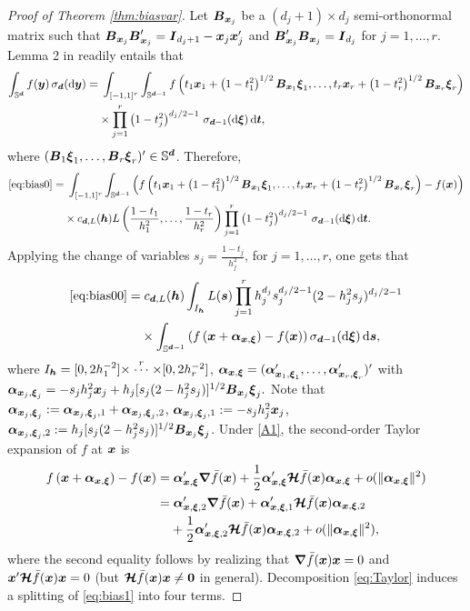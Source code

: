 \documentclass[oneside,11pt]{article}
\begin{document}
\begin{proof}[Proof of Theorem \ref{thm:biasvar}]
Let $\bB_{\bx_j}$ be a $(d_j+1)\times d_j$ semi-orthonormal matrix such that $\bB_{\bx_j}\bB_{\bx_j}'=\bI_{d_j+1}-\bx_j\bx_j'$ and $\bB_{\bx_j}'\bB_{\bx_j}=\bI_{d_j}$ for $j=1,\ldots,r$. Lemma 2 in \cite{Garcia-Portugues2013b} readily entails that
\begin{align*}
    \int_{\Sr}f(\by)\,\sigmar(\rd\by)=&\;\int_{[-1,1]^r}\int_{\mathbb{S}^{\bd-1}} f\lrp{t_1 \bx_1+\left(1-t_1^2\right)^{1/2} \bB_{\bx_1} \bxi_1,\ldots,t_r \bx_r+\left(1-t_r^2\right)^{1/2} \bB_{\bx_r} \bxi_r}\\
    &\times \prod_{j=1}^r \left(1-t_j^2\right)^{d_j/2-1}\,\sigmarm(\rd\bxi)\,\rd \bt,
\end{align*}
where $(\bB_1\bxi_1,\ldots,\bB_r\bxi_r)'\in\Sr$. Therefore,
\begin{align}
	\eqref{eq:bias0}=&\;\int_{[-1,1]^r}\int_{\mathbb{S}^{\bd-1}}\left(f\lrp{t_1 \bx_1+\left(1-t_1^2\right)^{1/2} \bB_{\bx_1} \bxi_1,\ldots,t_r \bx_r+\left(1-t_r^2\right)^{1/2} \bB_{\bx_r} \bxi_r}-f(\bx)\right)\nonumber\\
	&\times c_{\bd,L}(\bh)L\lrp{\frac{1-t_1}{h_1^2},\ldots, \frac{1-t_r}{h_r^2}}  \prod_{j=1}^r \left(1-t_j^2\right)^{d_j/2-1}\,\sigmarm(\rd\bxi)\,\rd \bt.\label{eq:bias00}
\end{align}
Applying the change of variables $s_j=\frac{1-t_j}{h_j^2}$, for $j=1,\ldots,r$, one gets that
\begin{align}
    \eqref{eq:bias00}=&\; c_{\bd,L}(\bh)\int_{I_\bh} L(\bs)\prod_{j=1}^r h_j^{d_j}s_j^{d_j/2-1} (2-h_j^2s_j)^{d_j/2-1}\nonumber\\
    & \times \int_{\mathbb{S}^{\bd-1}}\left(f\left(\bx+\ba_{\bx,\bxi}\right)-f(\bx)\right)\sigmarm(\rd\bxi)\,\rd \bs,\label{eq:bias1}
\end{align}
where $I_\bh=[0,2h^{-2}_1]\times\stackrel{r}{\cdots}\times[0,2h^{-2}_r]$, $\ba_{\bx,\bxi}=(\ba_{\bx_1,\bxi_1}',\ldots,\ba_{\bx_r,\bxi_r}')'$ with
$
\ba_{\bx_j,\bxi_j}=-s_jh_j^2\bx_j+h_j[s_j(2-h_j^2s_j)]^{1/2}\bB_{\bx_j}\bxi_j.
$
Note that  $\ba_{\bx_j,\bxi_j}\defin \ba_{\bx_j,\bxi_j,1}+\ba_{\bx_j,\bxi_j,2}$, $\ba_{\bx_j,\bxi_j,1}\defin -s_jh_j^2\bx_j$, $\ba_{\bx_j,\bxi_j,2}\defin h_j[s_j(2-h_j^2s_j)]^{1/2}\bB_{\bx_j}\bxi_j$. Under \ref{A1}, the second-order Taylor expansion of $f$ at $\bx$ is
\begin{align}
    f\left(\bx+\ba_{\bx,\bxi}\right)-f(\bx)=&\;\ba'_{\bx,\bxi}\bnabla \bar{f}(\bx)+\frac{1}{2}\ba'_{\bx,\bxi}\bHcal \bar{f}(\bx)\ba_{\bx,\bxi}+o(\|\ba_{\bx,\bxi}\|^2)\nonumber\\
    =&\;\ba'_{\bx,\bxi,2}\bnabla \bar{f}(\bx)+\ba'_{\bx,\bxi,1}\bHcal \bar{f}(\bx)\ba_{\bx,\bxi,2}\nonumber\\
    &+\frac{1}{2}\ba'_{\bx,\bxi,2}\bHcal \bar{f}(\bx)\ba_{\bx,\bxi,2}+o(\|\ba_{\bx,\bxi}\|^2),\label{eq:Taylor}
\end{align}
where the second equality follows by realizing that $\bnabla \bar{f}(\bx) \bx=0$ and $\bx'\bHcal \bar{f}(\bx) \bx=0$ (but $\bHcal \bar{f}(\bx) \bx\neq\zero$ in general). Decomposition \eqref{eq:Taylor} induces a splitting of \eqref{eq:bias1} into four terms.


\end{proof}
\end{document}
